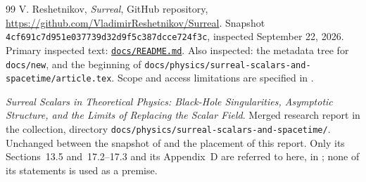 \documentclass[11pt,letterpaper]{article}
\numberwithin{equation}{section}
\theoremstyle{definition}
\theoremstyle{remark}
\newcommand{\Commit}{\nolinkurl{4cf691c7d951e037739d32d9f5c387dcce724f3c}}
\begin{document}
\begin{thebibliography}{99}
V. Reshetnikov,
\emph{Surreal}, GitHub repository,
\url{https://github.com/VladimirReshetnikov/Surreal}.
Snapshot \Commit, inspected September 22, 2026.
Primary inspected text:
\href{https://github.com/VladimirReshetnikov/Surreal/blob/4cf691c7d951e037739d32d9f5c387dcce724f3c/docs/README.md}
{\texttt{docs/README.md}}.
Also inspected: the metadata tree for \texttt{docs/new}, and the beginning of
\texttt{docs/physics/surreal-scalars-and-spacetime/article.tex}.
Scope and access limitations are specified in .

\emph{Surreal Scalars in Theoretical Physics: Black-Hole Singularities,
Asymptotic Structure, and the Limits of Replacing the Scalar Field}.
Merged research report in the collection, directory
\nolinkurl{docs/physics/surreal-scalars-and-spacetime/}. Unchanged between the
snapshot of \cite{Repo} and the placement of this report. Only its
Sections~13.5 and~17.2--17.3 and its Appendix~D are referred to here, in
; none of its statements is used as a premise.

\end{thebibliography}
\end{document}
